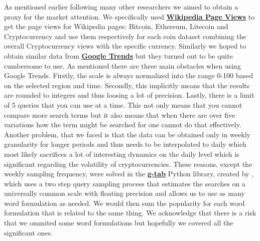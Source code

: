 As mentioned earlier following many other researchers we aimed to 
obtain a proxy for the market
attention. We specifically used \textbf{\href{https://pageviews.wmcloud.org/}{Wikipedia Page Views}}
to get the page views for Wikipedia pages: Bitcoin, Ethereum, Litecoin and 
Cryptocurrency and use them respectively for each coin dataset combining 
the overall Cryptocurrency views with the specific currency. Similarly we 
hoped to obtain similar data from 
\textbf{\href{https://trends.google.com/trends/}{Google Trends}} but they
turned out to be quite cumbersome to use. As \cite{West2020a} mentioned 
there are three main obstacles when using Google Trends. Firstly, the scale
is always normalized into the range 0-100 based on the selected region and time.
Secondly, this implicitly means that the results are rounded to integers and thus 
loosing a lot of precision. Lastly, there is a limit of 5 queries that you can 
use at a time. This not only means that you cannot compare more search terms 
but it also means that when there are over five variations how the term might
be searched for one cannot do that effectively. Another problem, 
that we faced is that the data can be obtained only in weekly granularity
for longer periods and thus needs to be interpolated to daily which 
most likely sacrifices a lot of interesting dynamics on the daily level which
is significant regarding the volatility of cryptocurrencies. 
These reasons, except the weekly sampling frequency, were solved in 
the \textbf{\href{https://github.com/epfl-dlab/GoogleTrendsAnchorBank}{g-tab}}
Python library, created by \cite{West2020a}, which uses a 
two step query sampling process that 
estimates the searches on a universally common scale with floating precision and allows 
us to use as many word formulation as needed. We would then sum the popularity
for each word formulation that is related to the same thing. We acknowledge
that there is a risk that we ommited some word formulations but hopefully
we covered all the significant ones.


